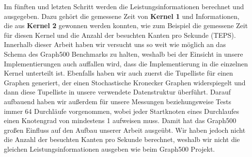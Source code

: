 \documentclass[11pt,a4paper]{article}
\begin{document}
Im fünften und letzten Schritt werden die Leistungsinformationen berechnet und ausgegeben. Dazu gehört die gemessene Zeit von \textbf{Kernel 1} und Informationen, die aus \textbf{Kernel 2} gewonnen werden konnten, wie zum Beispiel die gemessene Zeit für diesen Kernel und die Anzahl der besuchten Kanten pro Sekunde (TEPS).\\
Innerhalb dieser Arbeit haben wir versucht uns so weit wie möglich an das Schema des Graph500 Benchmarks zu halten, weshalb bei der Einsicht in unsere Implementierungen auch auffallen wird, dass die Implementierung in die einzelnen Kernel unterteilt ist. Ebenfalls haben wir auch zuerst die Tupelliste für einen Graphen generiert, der einen Stochastische Kronecker Graphen widerspiegelt und dann diese Tupelliste in unsere verwendete Datenstruktur überführt. Darauf aufbauend haben wir außerdem für unsere Messungen beziehungsweise Tests immer 64 Durchläufe vorgenommen, wobei jeder Startknoten eines Durchlaufes einen Knotengrad von mindestens 1 aufweisen muss. Damit hat das Graph500 großen Einfluss auf den Aufbau unserer Arbeit ausgeübt. Wir haben jedoch nicht die Anzahl der besuchten Kanten pro Sekunde berechnet, weshalb wir nicht die gleichen Leistungsinformationen ausgeben wie beim Graph500 Projekt.
\end{document}
